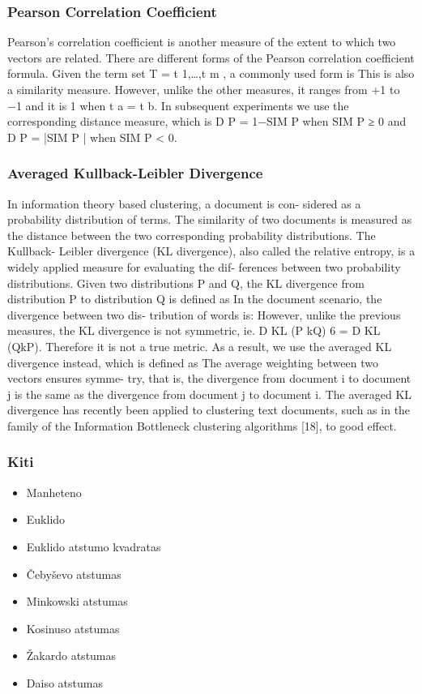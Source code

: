 \documentclass{VUMIFInfKursinis}
\begin{document}
\subsubsection{Pearson Correlation Coefficient}
Pearson’s correlation coefficient is another measure of the extent to which two vectors are related. There are different forms of the Pearson correlation coefficient formula. Given the term set T = {t 1,\ldots,t m }, a commonly used form is
This is also a similarity measure. However, unlike the other measures, it ranges from +1 to −1 and it is 1 when t a = t b. In subsequent experiments we use the corresponding distance measure, which is D P = 1−SIM P when SIM P ≥ 0 and D P = |SIM P | when SIM P < 0.

\subsubsection{Averaged Kullback-Leibler Divergence}
In information theory based clustering, a document is con- sidered as a probability distribution of terms. The similarity of two documents is measured as the distance between the two corresponding probability distributions. The Kullback- Leibler divergence (KL divergence), also called the relative entropy, is a widely applied measure for evaluating the dif- ferences between two probability distributions.  
Given two distributions P and Q, the KL divergence from distribution P to distribution Q is defined as
In the document scenario, the divergence between two dis-
tribution of words is:
However, unlike the previous measures, the KL divergence is not symmetric, ie. D KL (P kQ) 6 = D KL (QkP). Therefore it is not a true metric. As a result, we use the averaged KL divergence instead, which is defined as
The average weighting between two vectors ensures symme- try, that is, the divergence from document i to document j is the same as the divergence from document j to document i. The averaged KL divergence has recently been applied to clustering text documents, such as in the family of the Information Bottleneck clustering algorithms [18], to good effect.

\subsubsection{Kiti}
\begin{itemize}
	\item Manheteno
	\item Euklido
	\item Euklido atstumo kvadratas
	\item Čebyševo atstumas 
	\item Minkowski atstumas 
	\item Kosinuso atstumas 
	\item Žakardo atstumas 
	\item Daiso atstumas 
\end{itemize}
\end{document}
